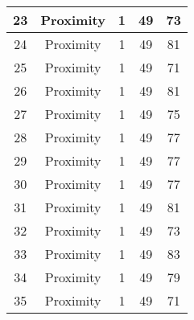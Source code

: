 \documentclass[results.tex]{subfiles}
\begin{document}
\begin{center}
\begin{tabular}{| c || c | c | c | c |}
            \hline
            23                      & Proximity                    & 1                      & 49                      & 73                   \\
            \hline
            24                      & Proximity                    & 1                      & 49                      & 81                   \\
            \hline
            25                      & Proximity                    & 1                      & 49                      & 71                   \\
            \hline
            26                      & Proximity                    & 1                      & 49                      & 81                   \\
            \hline
            27                      & Proximity                    & 1                      & 49                      & 75                   \\
            \hline
            28                      & Proximity                    & 1                      & 49                      & 77                   \\
            \hline
            29                      & Proximity                    & 1                      & 49                      & 77                   \\
            \hline
            30                      & Proximity                    & 1                      & 49                      & 77                   \\
            \hline
            31                      & Proximity                    & 1                      & 49                      & 81                   \\
            \hline
            32                      & Proximity                    & 1                      & 49                      & 73                   \\
            \hline
            33                      & Proximity                    & 1                      & 49                      & 83                   \\
            \hline
            34                      & Proximity                    & 1                      & 49                      & 79                   \\
            \hline
            35                      & Proximity                    & 1                      & 49                      & 71                   \\

\end{tabular}
\end{center}
\end{document}
